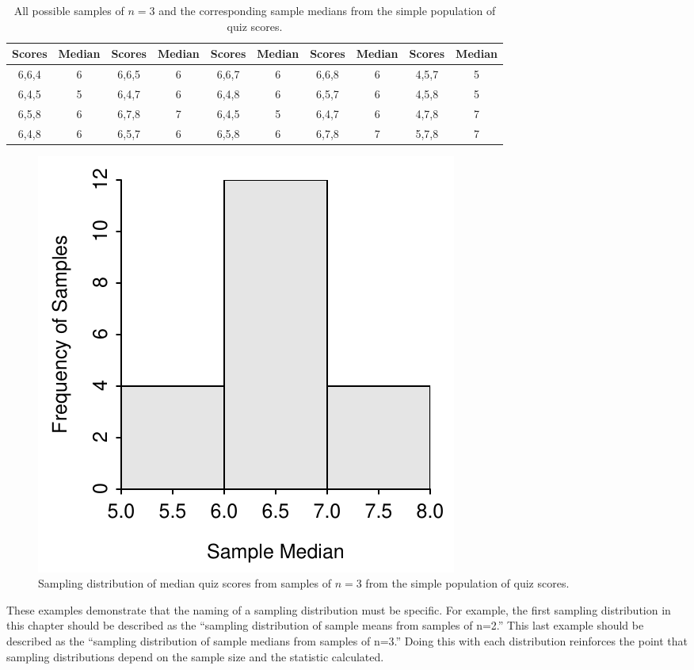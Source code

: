 \documentclass[10pt,openany]{book}\usepackage[]{graphicx}\usepackage[]{color}
\newenvironment{knitrout}{}{} %
\begin{document}
\begin{table}[htbp]
  \caption{All possible samples of $n=3$ and the corresponding sample medians from the simple population of quiz scores.}
  \label{tab:SDistQuizMdns3}
  \centering
    \begin{tabular}{cc||cc||cc||cc||cc}
\hline\hline
Scores & Median & Scores & Median & Scores &  Median & Scores & Median & Scores & Median \\
\hline
6,6,4 & 6 & 6,6,5 & 6 & 6,6,7 & 6 & 6,6,8 & 6 & 4,5,7 & 5 \\
6,4,5 & 5 & 6,4,7 & 6 & 6,4,8 & 6 & 6,5,7 & 6 & 4,5,8 & 5 \\
6,5,8 & 6 & 6,7,8 & 7 & 6,4,5 & 5 & 6,4,7 & 6 & 4,7,8 & 7 \\
6,4,8 & 6 & 6,5,7 & 6 & 6,5,8 & 6 & 6,7,8 & 7 & 5,7,8 & 7 \\
\hline\hline
    \end{tabular}
\end{table}

\begin{knitrout}
\color{fgcolor}\begin{figure}[hbtp]

{\centering \includegraphics[width=.4\linewidth]{Figs/SDistQuizMdns3-1} 

}

\caption[Sampling distribution of median quiz scores from samples of $n=3$ from the simple population of quiz scores]{Sampling distribution of median quiz scores from samples of $n=3$ from the simple population of quiz scores.}\label{fig:SDistQuizMdns3}
\end{figure}


\end{knitrout}


These examples demonstrate that the naming of a sampling distribution must be specific.  For example, the first sampling distribution in this chapter should be described as the ``sampling distribution of sample means from samples of n=2.''  This last example should be described as the ``sampling distribution of sample medians from samples of n=3.''  Doing this with each distribution reinforces the point that sampling distributions depend on the sample size and the statistic calculated.
\end{document}
